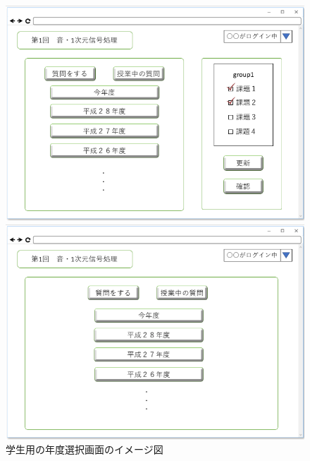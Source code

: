 \begin{figure}[htbp]
 \begin{minipage}{0.5\hsize}
  \begin{center}
   \includegraphics[width=1\linewidth,clip]{./img/30.png}
  \end{center}

 \end{minipage}
 \begin{minipage}{0.5\hsize}
  \begin{center}
   \includegraphics[width=1\linewidth,clip]{./img/31.png}
  \end{center}
 \end{minipage}
 \caption{学生用の年度選択画面のイメージ図}\label{fig:30}
\end{figure}

